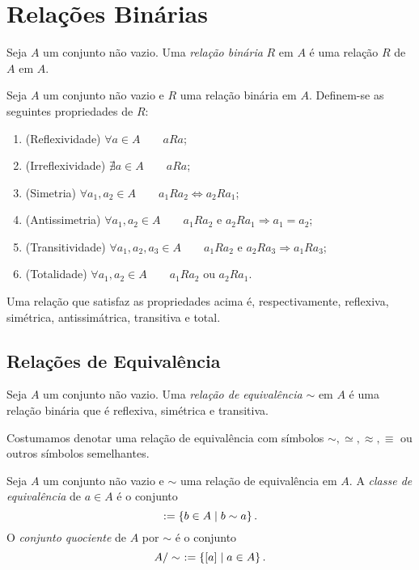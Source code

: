 \chapter{Relações Binárias}
	
\begin{defi}
	Seja $A$ um conjunto não vazio. Uma \emph{relação binária} $R$ em $A$ é uma relação $R$ de $A$ em $A$.
\end{defi}

\begin{defi}
	Seja $A$ um conjunto não vazio e $R$ uma relação binária em $A$. Definem-se as seguintes propriedades de $R$:
	\begin{enumerate}
	\item (Reflexividade) $\forall a \in A \qquad aRa$;
	\item (Irreflexividade) $\nexists a \in A \qquad aRa$;
	\item (Simetria) $\forall a_1,a_2 \in A \qquad a_1Ra_2 \Leftrightarrow a_2Ra_1$;
	\item (Antissimetria) $\forall a_1,a_2 \in A \qquad a_1Ra_2 \text{\ \ e\ \ } a_2Ra_1 \Rightarrow a_1=a_2$;
	\item (Transitividade) $\forall a_1,a_2,a_3 \in A \qquad a_1Ra_2 \text{\ \ e\ \ } a_2Ra_3 \Rightarrow a_1Ra_3$;
	\item (Totalidade) $\forall a_1,a_2 \in A \qquad a_1Ra_2 \text{\ \ ou\ \ } a_2Ra_1$.
	\end{enumerate}
	Uma relação que satisfaz as propriedades acima é, respectivamente, reflexiva, simétrica, antissimátrica, transitiva e total.
\end{defi}



\section{Relações de Equivalência}

\begin{defi}
	Seja $A$ um conjunto não vazio. Uma \emph{relação de equivalência} $\sim$ em $A$ é uma relação binária que é reflexiva, simétrica e transitiva.
\end{defi}

Costumamos denotar uma relação de equivalência com símbolos $\sim, \simeq, \approx, \equiv$ ou outros símbolos semelhantes.

\begin{defi}
	Seja $A$ um conjunto não vazio e $\sim$ uma relação de equivalência em $A$. A \emph{classe de equivalência} de $a \in A$ é o conjunto
	\begin{equation*}
	[a] := \set{b \in A}{b \sim a}.
	\end{equation*}
	O \emph{conjunto quociente} de $A$ por $\sim$ é o conjunto
	\begin{equation*}
	A/\sim \ := \left\{[a] \;\middle\vert\; a \in A \right\}.
	\end{equation*}
\end{defi}

